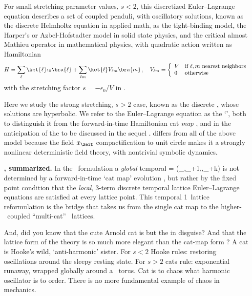 For small stretching parameter values, $s<2$, this discretized
Euler–\-Lagrange equation  describes a set of coupled
penduli, with oscillatory solutions, known as the discrete Helmholtz
equation in applied math, as  the
tight-binding model, the Harper's or Azbel-Hofstadter model in solid
state physics,  and
the critical almost Mathieu operator in mathematical physics,
with quadratic action  written as Hamiltonian
\[ %
H=\sum_\ell\ket{\ell}\epsilon_0\bra{\ell}
  + \sum_{\ell m}\ket{\ell}V_{\ell m}\bra{m}
\,,\quad
   V_{\ell m} = \left\{
     \begin{array}{ll}
         V & \mbox{if\ } \ell,m \mbox{ nearest neighbors}\\
         0 & \mbox{otherwise}
     \end{array}
             \right.
\] %
with the stretching factor ${s}=-\epsilon_0/V$ in
.

Here we study the strong stretching, $s>2$ case, known as the discrete
\sPe{},
whose solutions are hyperbolic. We refer to the
Euler–\-Lagrange equation
 as the `{\em \templatt}', both to distinguish it from
the forward-in-time Hamiltonian cat \emph{map} , and in the
anticipation of the \emph{\catlatt} to be discussed in the sequel
. {\catLatt} differs from all of the above model because the
field $\ssp_\zeit$ compactification to unit circle makes it a
strongly nonlinear deterministic field theory, with nontrivial symbolic
dynamics.

\bigskip

\noindent\textbf{\tempLatt, summarized.}
In the \spt\ formulation a \emph{global} {temporal {\lattstate}}
\beq
\transp{\Xx} %
             = (\ssp_\zeit,\ssp_{\zeit+1},\cdots,\ssp_{\zeit+k})
is not determined by a forward-in-time `cat map' evolution
, but rather by the fixed point condition
that the \emph{local}, 3-term discrete temporal lattice Euler–Lagrange
equations  are satisfied at every lattice point. This
temporal 1\dmn\ lattice reformulation is the bridge that takes us from
the single cat map  to the higher-\dmn\ coupled
``multi-cat'' \spt\ lattices.

And, did you know that the cute Arnold cat is but the %
{\sPe} in disguise? And that the lattice form 
of the theory is so much more elegant than the
cat-map form ?
A cat is Hooke's wild, `anti-harmonic' sister.
For $s<2$ Hooke rules: restoring oscillations around the sleepy resting
state.
For $s>2$ cats rule: exponential runaway, wrapped globally around a
\statesp\ torus. {Cat} is to {chaos} what {harmonic oscillator} is to
{order}. There is no more fundamental example of chaos in mechanics.


\renewcommand{\period}[1]{{\ensuremath{T_{#1}}}}         %
